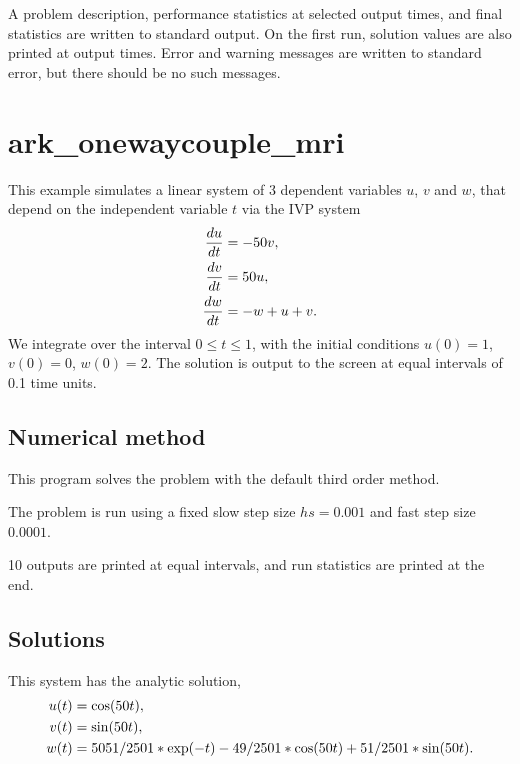\documentclass[letterpaper,10pt,english]{sphinxmanual}
\begin{document}
A problem description, performance statistics at selected output
times, and final statistics are written to standard output.  On the
first run, solution values are also printed at output times.  Error
and warning messages are written to standard error, but there should
be no such messages.


\section{ark\_onewaycouple\_mri}
\label{c_serial:ark-onewaycouple-mri}\label{c_serial:id33}
This example simulates a linear system of 3 dependent variables \(u\),
\(v\) and \(w\), that depend on the independent variable \(t\) via
the IVP system
\begin{gather}
\begin{split}\frac{du}{dt} &= -50 v, \\
\frac{dv}{dt} &= 50 u, \\
\frac{dw}{dt} &= -w + u + v.\end{split}\notag
\end{gather}
We integrate over the interval \(0 \le t \le 1\), with the initial
conditions \(u(0) = 1\), \(v(0) = 0\), \(w(0)= 2\).  The
solution is output to the screen at equal intervals of 0.1 time units.


\subsection{Numerical method}
\label{c_serial:id34}
This program solves the problem with the default third order method.

The problem is run using a fixed slow step size \(hs=0.001\) and fast step
size \(0.0001\).

10 outputs are printed at equal intervals, and run statistics
are printed at the end.


\subsection{Solutions}
\label{c_serial:id35}
This system has the analytic solution,
\begin{gather}
\begin{split}u(t) &= \cos(50t), \\
v(t) &= \sin(50t), \\
w(t) &= 5051/2501*\exp(-t) - 49/2501*\cos(50t) + 51/2501*\sin(50t).\end{split}\notag
\end{gather}
\end{document}
